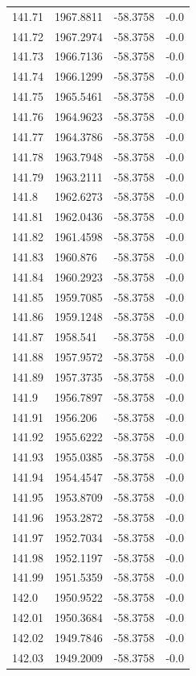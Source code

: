\begin{table}[H]
\begin{tabular}{llll}
141.71 & 1967.8811 & -58.3758 & -0.0 \\
141.72 & 1967.2974 & -58.3758 & -0.0 \\
141.73 & 1966.7136 & -58.3758 & -0.0 \\
141.74 & 1966.1299 & -58.3758 & -0.0 \\
141.75 & 1965.5461 & -58.3758 & -0.0 \\
141.76 & 1964.9623 & -58.3758 & -0.0 \\
141.77 & 1964.3786 & -58.3758 & -0.0 \\
141.78 & 1963.7948 & -58.3758 & -0.0 \\
141.79 & 1963.2111 & -58.3758 & -0.0 \\
141.8 & 1962.6273 & -58.3758 & -0.0 \\
141.81 & 1962.0436 & -58.3758 & -0.0 \\
141.82 & 1961.4598 & -58.3758 & -0.0 \\
141.83 & 1960.876 & -58.3758 & -0.0 \\
141.84 & 1960.2923 & -58.3758 & -0.0 \\
141.85 & 1959.7085 & -58.3758 & -0.0 \\
141.86 & 1959.1248 & -58.3758 & -0.0 \\
141.87 & 1958.541 & -58.3758 & -0.0 \\
141.88 & 1957.9572 & -58.3758 & -0.0 \\
141.89 & 1957.3735 & -58.3758 & -0.0 \\
141.9 & 1956.7897 & -58.3758 & -0.0 \\
141.91 & 1956.206 & -58.3758 & -0.0 \\
141.92 & 1955.6222 & -58.3758 & -0.0 \\
141.93 & 1955.0385 & -58.3758 & -0.0 \\
141.94 & 1954.4547 & -58.3758 & -0.0 \\
141.95 & 1953.8709 & -58.3758 & -0.0 \\
141.96 & 1953.2872 & -58.3758 & -0.0 \\
141.97 & 1952.7034 & -58.3758 & -0.0 \\
141.98 & 1952.1197 & -58.3758 & -0.0 \\
141.99 & 1951.5359 & -58.3758 & -0.0 \\
142.0 & 1950.9522 & -58.3758 & -0.0 \\
142.01 & 1950.3684 & -58.3758 & -0.0 \\
142.02 & 1949.7846 & -58.3758 & -0.0 \\
142.03 & 1949.2009 & -58.3758 & -0.0 \\

\end{tabular}
\end{table}
